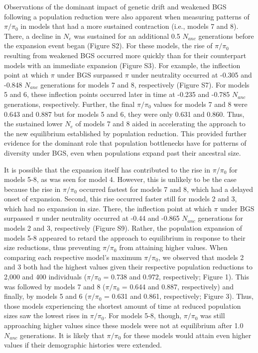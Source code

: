 \documentclass[9pt,twocolumn,twoside]{rilabRxiv}
\begin{document}
Observations of the dominant impact of genetic drift and weakened BGS
following a population reduction were also apparent when measuring
patterns of $\pi/\pi_0$ in models that had a more sustained
contraction (i.e., models 7 and 8). There, a decline in
$N_e$ was sustained for an additional 0.5
$N_{anc}$ generations before the expansion event began
(Figure S2). For these models, the rise of $\pi/\pi_0$
resulting from weakened BGS occurred more quickly than for their
counterpart models with an immediate expansion (Figure S3). For example,
the inflection point at which $\pi$ under BGS surpassed $\pi$ under neutrality
occurred at -0.305 and -0.848 $N_{anc}$ generations
for models 7 and 8, respectively (Figure S7). For models 5 and 6, these
inflection points occurred later in time at -0.235 and -0.785
$N_{anc}$ generations, respectively. Further, the
final $\pi/\pi_0$ values for models 7 and 8 were 0.643 and
0.887 but for models 5 and 6, they were only 0.631 and 0.860. Thus, the
sustained lower $N_e$ of models 7 and 8 aided in
accelerating the approach to the new equilibrium established by
population reduction. This provided further evidence for the dominant
role that population bottlenecks have for patterns of diversity under
BGS, even when populations expand past their ancestral size.

It is possible that the expansion itself has contributed to the rise in
$\pi/\pi_0$ for models 5-8, as was seen for model 4. However,
this is unlikely to be the case because the rise in $\pi/\pi_0$
occurred fastest for models 7 and 8, which had a delayed onset of
expansion. Second, this rise occurred faster still for models 2 and 3,
which had no expansion in size. There, the inflection point at which $\pi$
under BGS surpassed $\pi$ under neutrality occurred at -0.44 and -0.865
$N_{anc}$ generations for models 2 and 3, respectively
(Figure S9). Rather, the population expansion of models 5-8 appeared to
retard the approach to equilibrium in response to their size reductions,
thus preventing $\pi/\pi_0$ from attaining higher values. When
comparing each respective model's maximum $\pi/\pi_0$, we
observed that models 2 and 3 both had the highest values given their
respective population reductions to 2,000 and 400 individuals
($\pi/\pi_0$ = 0.738 and 0.972, respectively; Figure 1). This
was followed by models 7 and 8 ($\pi/\pi_0$ = 0.644 and 0.887,
respectively) and finally, by models 5 and 6 ($\pi/\pi_0$ =
0.631 and 0.861, respectively; Figure 3). Thus, those models
experiencing the shortest amount of time at reduced population sizes saw
the lowest rises in $\pi/\pi_0$. For models 5-8, though,
$\pi/\pi_0$ was still approaching higher values since these
models were not at equilibrium after 1.0 $N_{anc}$
generations. It is likely that $\pi/\pi_0$ for these models
would attain even higher values if their demographic histories were
extended.
\end{document}
